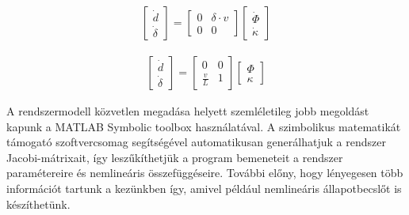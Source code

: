 \begin{minipage}{0.45\linewidth}
    \begin{align} \label{eq:of3}
        \begin{bmatrix}
               \dot{d} \\
               \dot{\delta}
        \end{bmatrix}
        =
        \begin{bmatrix}
               0 & \delta \cdot v \\
               0 & 0
        \end{bmatrix}
        \begin{bmatrix}
               \dot{\Phi} \\
               \dot{\kappa}
        \end{bmatrix}
     \end{align}
\end{minipage}
\begin{minipage}{0.45\linewidth}
    \begin{align} \label{eq:of4}
        \begin{bmatrix}
               \dot{d} \\
               \dot{\delta}
        \end{bmatrix}
        =
        \begin{bmatrix}
           0 & 0 \\
           \frac{v}{L} & 1
         \end{bmatrix}
         \begin{bmatrix}
               \Phi \\
               \kappa
        \end{bmatrix}
     \end{align}
\end{minipage}

A rendszermodell közvetlen megadása helyett szemléletileg jobb megoldást kapunk a MATLAB Symbolic toolbox használatával. A szimbolikus matematikát támogató szoftvercsomag segítségével automatikusan generálhatjuk a rendszer Jacobi-mátrixait, így leszűkíthetjük a program bemeneteit a rendszer paramétereire és nemlineáris összefüggéseire. További előny, hogy lényegesen több információt tartunk a kezünkben így, amivel például nemlineáris állapotbecslőt is készíthetünk.
     
